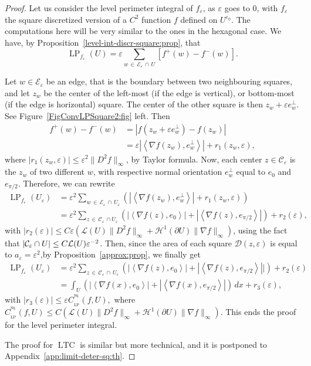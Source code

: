 \documentclass[AHL,Unicode,longabstracts,published]{cedram}
\newcommand{\eps}{\varepsilon}
\DeclareMathOperator{\LTC}{LTC}
\DeclareMathOperator{\LP}{LP}
\DeclareMathOperator{\Sq}{Sq}
\newcommand{\calH}{\mathcal{H}}
\newcommand{\calL}{\mathcal{L}}
\newcommand{\calC}{\mathcal{C}}
\newcommand{\calD}{\mathcal{D}}
\newcommand{\calE}{\mathcal{E}}
\begin{document}
\begin{proof}
Let us consider the level perimeter integral of $f_\eps$, as $\eps$ goes to $0$, with $f_\eps$ the square discretized version of a $C^2$ function $f$ defined on $U^{\eps_0}$. The computations here will be very similar to the ones in the hexagonal case. We have, by Proposition~\ref{level-int-discr-square:prop}, that
\[
\LP_{f_\eps}(U) = \eps \sum_{w\,\in\,\calE_\eps\,\cap\,U}\left[f^+(w) - f^-(w)\right].
\]

Let $w\in\calE_\eps$ be an edge, that is the boundary between two neighbouring squares, and let $z_w$ be the center of the left-most (if the edge is vertical), or bottom-most (if the edge is horizontal) square. The center of the other square is then $z_w+\eps e_w^\perp$. See Figure~\ref{FigConvLPSquare2:fig} left. Then
\begin{align*}
f^+(w) - f^-(w) & = \left| f\left(z_w+\eps e_w^\perp\right) - f(z_w)\right|
\\
& = \eps \left|\left\langle \nabla f(z_w),e_w^\perp\right\rangle\right| + r_1(z_w,\eps),
\end{align*}
where $|r_1(z_w,\eps)|\leq \eps^2 \|D^2f\|_\infty$, by Taylor formula. Now, each center $z\in\calC_\eps$ is the $z_w$ of two different $w$, with respective normal orientation $e_w^\perp$ equal to $e_{0}$ and $e_{\pi/2}$. Therefore, we can rewrite
\begin{align*}
\LP_{f_\eps}(U_\eps) & = \eps^2 \sum_{w\,\in\,\calE_\eps\,\cap\,U_\eps} \left(\left|\left\langle \nabla f(z_w),e_w^\perp\right\rangle\right| + r_1(z_w,\eps) \right) \\
& = \eps^2 \sum_{z\,\in\,\calC_\eps\,\cap U_\eps} \left(\left|\left\langle \nabla f(z),e_0\right\rangle\right| +\left|\left\langle \nabla f(z),e_{\pi/2}\right\rangle\right|\right) + r_2(\eps),
\end{align*}
with $|r_2(\eps)|\le C\eps \left({\calL}(U) \|D^2 f\|_\infty +{\calH}^1(\partial U)\|\nabla f\|_\infty\right)$, using the fact that $|\calC_\eps \cap U|\linebreak\le C {\calL}(U)
\eps^{-2}$. Then, since the area of each square $\calD(z,\eps)$ is equal to $a_\eps=\eps^2$,\linebreak by Proposition~\ref{approx:prop}, we finally get
\begin{align*}
\LP_{f_\eps}(U_\eps) & = \eps^2 \sum_{z\,\in\,\calC_\eps\,\cap\,U_\eps} \left(\left|\left\langle \nabla f(z),e_0 \right\rangle\right| +\left|\left\langle \nabla f(z),e_{\pi/2} \right\rangle \right||\right) + r_2(\eps) \\
& = \int_U \left(\left|\left\langle
\nabla f(x),e_0\right\rangle\right| +\left|\left\langle \nabla f(x),e_{\pi/2}\right\rangle\right|
\right) \, dx + r_3(\eps),
\end{align*}
with $|r_3(\eps)|\le \eps C_{_{\LP}}^{^{\Sq}}(f,U),$ where $ C_{_{\LP}}^{^{\Sq}}(f,U)\le C \left({\calL}(U) \|D^2 f\|_\infty +{\calH}^1(\partial U)\|\nabla f\|_\infty\right)$. This ends the proof for the level perimeter integral.


The proof for $\LTC$ is similar but more technical, and it is postponed to Appendix~\ref{app:limit-deter-sq:th}.
\end{proof}
\end{document}
